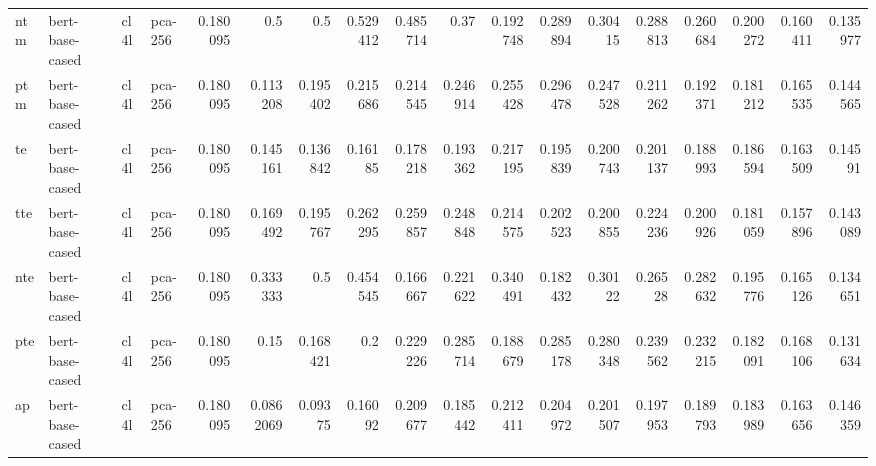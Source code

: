 \begin{tabular}{llllrrrrrrrrrrrrrr}
 ntm         & bert-base-cased     & cl4l             & pca-256               &         0.180095 &        0.5       &         0.5      &         0.529412 &        0.485714  &         0.37     &         0.192748 &         0.289894 &         0.30415  &         0.288813 &          0.260684 &          0.200272 &          0.160411 &          0.135977 \\
 ptm         & bert-base-cased     & cl4l             & pca-256               &         0.180095 &        0.113208  &         0.195402 &         0.215686 &        0.214545  &         0.246914 &         0.255428 &         0.296478 &         0.247528 &         0.211262 &          0.192371 &          0.181212 &          0.165535 &          0.144565 \\
 te          & bert-base-cased     & cl4l             & pca-256               &         0.180095 &        0.145161  &         0.136842 &         0.16185  &        0.178218  &         0.193362 &         0.217195 &         0.195839 &         0.200743 &         0.201137 &          0.188993 &          0.186594 &          0.163509 &          0.14591  \\
 tte         & bert-base-cased     & cl4l             & pca-256               &         0.180095 &        0.169492  &         0.195767 &         0.262295 &        0.259857  &         0.248848 &         0.214575 &         0.202523 &         0.200855 &         0.224236 &          0.200926 &          0.181059 &          0.157896 &          0.143089 \\
 nte         & bert-base-cased     & cl4l             & pca-256               &         0.180095 &        0.333333  &         0.5      &         0.454545 &        0.166667  &         0.221622 &         0.340491 &         0.182432 &         0.30122  &         0.26528  &          0.282632 &          0.195776 &          0.165126 &          0.134651 \\
 pte         & bert-base-cased     & cl4l             & pca-256               &         0.180095 &        0.15      &         0.168421 &         0.2      &        0.229226  &         0.285714 &         0.188679 &         0.285178 &         0.280348 &         0.239562 &          0.232215 &          0.182091 &          0.168106 &          0.131634 \\
 ap          & bert-base-cased     & cl4l             & pca-256               &         0.180095 &        0.0862069 &         0.09375  &         0.16092  &        0.209677  &         0.185442 &         0.212411 &         0.204972 &         0.201507 &         0.197953 &          0.189793 &          0.183989 &          0.163656 &          0.146359 \\

\end{tabular}
